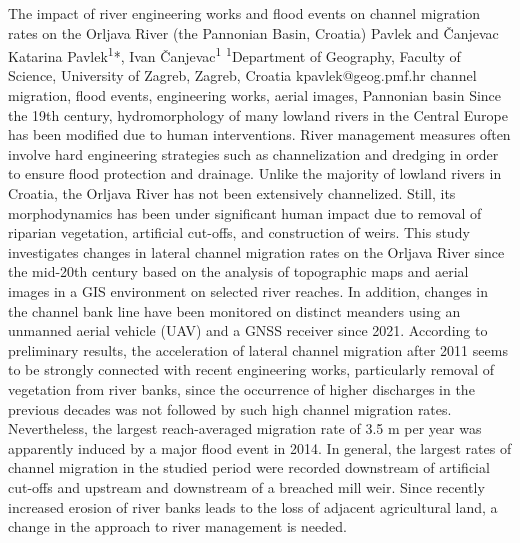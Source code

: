 \abstract
{The impact of river engineering works and flood events on channel migration rates on the Orljava River (the Pannonian Basin, Croatia)} 
{Pavlek and Čanjevac} 
{Katarina Pavlek\textsuperscript{1}*, Ivan Čanjevac\textsuperscript{1}} 
{\TLtag} 
{
\textsuperscript{1}Department of Geography, Faculty of Science, University of Zagreb, Zagreb, Croatia
}
{kpavlek@geog.pmf.hr}  %
{channel migration, flood events, engineering works, aerial images, Pannonian basin}
{Since the 19th century, hydromorphology of many lowland rivers in the Central Europe has been modified due to human interventions. River management measures often involve hard engineering strategies such as channelization and dredging in order to ensure flood protection and drainage. Unlike the majority of lowland rivers in Croatia, the Orljava River has not been extensively channelized. Still, its morphodynamics has been under significant human impact due to removal of riparian vegetation, artificial cut-offs, and construction of weirs. This study investigates changes in lateral channel migration rates on the Orljava River since the mid-20th century based on the analysis of topographic maps and aerial images in a GIS environment on selected river reaches. In addition, changes in the channel bank line have been monitored on distinct meanders using an unmanned aerial vehicle (UAV) and a GNSS receiver since 2021. According to preliminary results, the acceleration of lateral channel migration after 2011 seems to be strongly connected with recent engineering works, particularly removal of vegetation from river banks, since the occurrence of higher discharges in the previous decades was not followed by such high channel migration rates. Nevertheless, the largest reach-averaged migration rate of 3.5 m per year was apparently induced by a major flood event in 2014. In general, the largest rates of channel migration in the studied period were recorded downstream of artificial cut-offs and upstream and downstream of a breached mill weir. Since recently increased erosion of river banks leads to the loss of adjacent agricultural land, a change in the approach to river management is needed.
}
{
}

